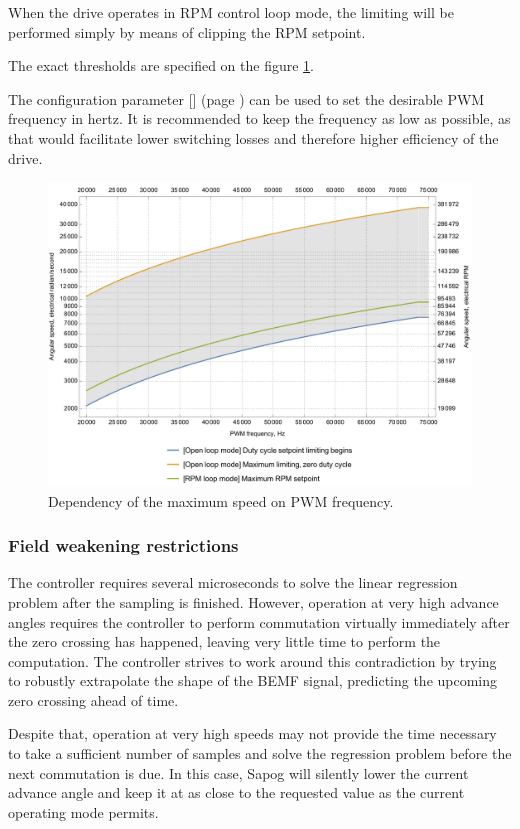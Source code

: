 \documentclass{zubaxdoc}
\newcommand{\CfgRef}[1]{
    \StrSubstitute{#1}{+}{\textunderscore}[\temp]
    \texttt{\temp} {\footnotesize (page \pageref{#1})}
}
\begin{document}
When the drive operates in RPM control loop mode, the limiting will be performed simply by means of
clipping the RPM setpoint.

The exact thresholds are specified on the figure \ref{pwm_maximum_speed}.

The configuration parameter \CfgRef{mot+pwm+hz} can be used to set the desirable PWM frequency
in hertz.
It is recommended to keep the frequency as low as possible,
as that would facilitate lower switching losses and therefore higher efficiency of the drive.

\begin{figure}[hbt]
    \centering
	\includegraphics[width=\textwidth]{pwm_maximum_speed}
	\caption{Dependency of the maximum speed on PWM frequency.
	\label{pwm_maximum_speed}}
\end{figure}

\subsubsection{Field weakening restrictions}

The controller requires several microseconds to solve the linear regression problem after the sampling is
finished.
However, operation at very high advance angles requires the controller to perform commutation virtually
immediately after the zero crossing has happened, leaving very little time to perform the computation.
The controller strives to work around this contradiction by trying to robustly extrapolate the shape of the
BEMF signal, predicting the upcoming zero crossing ahead of time.

Despite that, operation at very high speeds may not provide the time necessary to take a sufficient
number of samples and solve the regression problem before the next commutation is due.
In this case, Sapog will silently lower the current advance angle and keep it at as close to the requested
value as the current operating mode permits.
\end{document}
